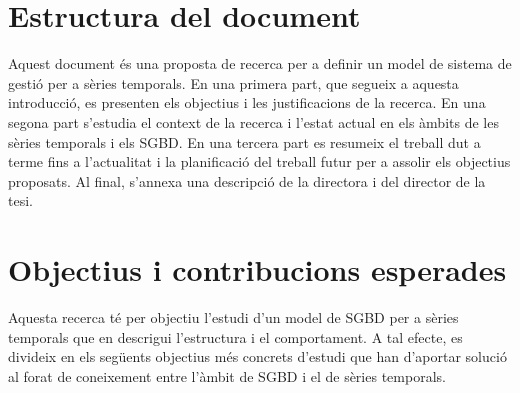 \section{Estructura del document}

Aquest document és una proposta de recerca per a definir un model de
sistema de gestió per a sèries temporals. En una primera part, que
segueix a aquesta introducció, es presenten els objectius i les
justificacions de la recerca. En una segona part s'estudia el context
de la recerca i l'estat actual en els àmbits de les sèries temporals i
els SGBD. En una tercera part es resumeix el treball dut a terme fins
a l'actualitat i la planificació del treball futur per a assolir els
objectius proposats. Al final, s'annexa una descripció de la directora
i del director de la tesi.




\section{Objectius i contribucions esperades}
\label{sec:objectius}

Aquesta recerca té per objectiu l'estudi d'un model de SGBD per a
sèries temporals que en descrigui l'estructura i el comportament. A
tal efecte, es divideix en els següents objectius més concrets
d'estudi que han d'aportar solució al forat de coneixement entre
l'àmbit de SGBD i el de sèries temporals.


